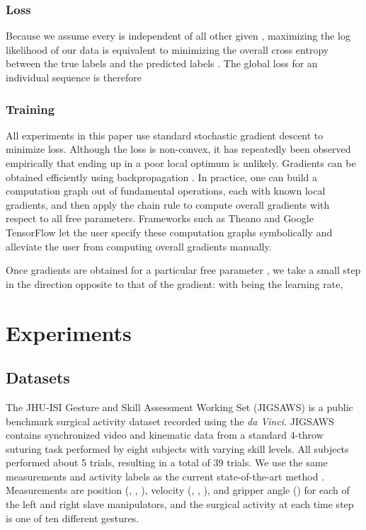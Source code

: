 \documentclass{llncs}
\begin{document}
\subsubsection{Loss}

Because we assume every  is independent of all other  given , maximizing the log likelihood of our data is equivalent to minimizing the overall cross entropy between the true labels  and the predicted labels . The global loss for an individual sequence is therefore


\subsubsection{Training}

All experiments in this paper use standard stochastic gradient descent to minimize loss. Although the loss is non-convex, it has repeatedly been observed empirically that ending up in a poor local optimum is unlikely. Gradients can be obtained efficiently using backpropagation \cite{rumelhart1988learning}. In practice, one can build a computation graph out of fundamental operations, each with known local gradients, and then apply the chain rule to compute overall gradients with respect to all free parameters. Frameworks such as Theano and Google TensorFlow let the user specify these computation graphs symbolically and alleviate the user from computing overall gradients manually.

Once gradients are obtained for a particular free parameter , we take a small step in the direction opposite to that of the gradient: with  being the learning rate,


\section{Experiments}

\subsection{Datasets}

The JHU-ISI Gesture and Skill Assessment Working Set (JIGSAWS) \cite{gao2014} is a public benchmark surgical activity dataset recorded using the \emph{da Vinci}. JIGSAWS contains synchronized video and kinematic data from a standard 4-throw suturing task performed by eight subjects with varying skill levels. All subjects performed about 5 trials, resulting in a total of 39 trials. We use the same measurements and activity labels as the current state-of-the-art method \cite{lea2016learning}. Measurements are position (, , ), velocity (, , ), and gripper angle () for each of the left and right slave manipulators, and the surgical activity at each time step is one of ten different gestures.
\end{document}
